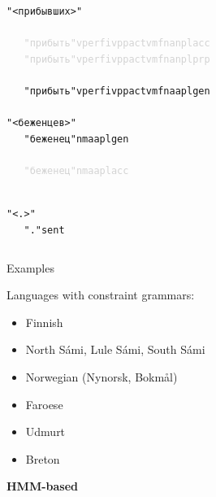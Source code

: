 \documentclass{beamer}
\begin{document}
\begin{frame}
\begin{columns}
\begin{tiny}
\begin{alltt}
~\\
"<прибывших>"\\
\textcolor{lightgray}{
~~~"прибыть" v perf iv pp actv mfn an pl acc  \\
~~~"прибыть" v perf iv pp actv mfn an pl prp \\
}
~~~"прибыть" v perf iv pp actv mfn aa pl gen
~\\
"<беженцев>"\\
~~~"беженец" n m aa pl gen\\
\textcolor{lightgray}{
~~~"беженец" n m aa pl acc
}

~\\
"<.>"\\
~~~"." sent
\end{alltt}
\end{tiny}
\end{columns}

\end{frame}
%
%
%
%
%
%
%
%
%
%
%

\begin{frame}{Examples}

Languages with constraint grammars:
\begin{itemize}
  \item Finnish
  \item North Sámi, Lule Sámi, South Sámi
  \item Norwegian (Nynorsk, Bokmål)
  \item Faroese
  \item Udmurt
  \item Breton
\end{itemize}

\end{frame}


\begin{frame}
\centering
{\LARGE {\bf HMM-based } }
\end{frame}
\end{document}
